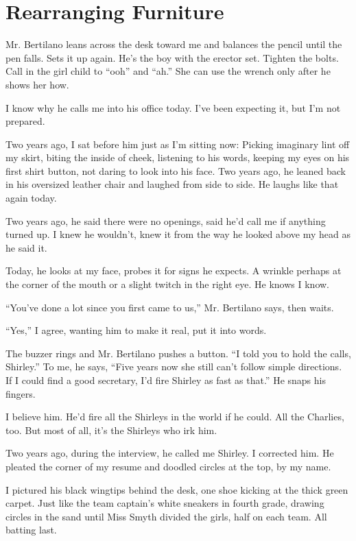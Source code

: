 \documentclass[twoside,10pt]{book}
\begin{document}
\cleardoublepage
\chapter{Rearranging Furniture}

Mr. Bertilano leans across the desk toward me and balances the pencil
until the pen falls. Sets it up again. He's the boy with the erector
set. Tighten the bolts. Call in the girl child to ``ooh'' and ``ah.'' She
can use the wrench only after he shows her how.

I know why he calls me into his office today. I've been expecting it,
but I'm not prepared.

Two years ago, I sat before him just as I'm sitting now: Picking
imaginary lint off my skirt, biting the inside of cheek, listening to
his words, keeping my eyes on his first shirt button, not daring to look
into his face. Two years ago, he leaned back in his oversized leather
chair and laughed from side to side. He laughs like that again today.

Two years ago, he said there were no openings, said he'd call me if
anything turned up. I knew he wouldn't, knew it from the way he looked
above my head as he said it.

Today, he looks at my face, probes it for signs he expects. A wrinkle
perhaps at the corner of the mouth or a slight twitch in the right eye.
He knows I know.

``You've done a lot since you first came to us,'' Mr. Bertilano says,
then waits.

``Yes,'' I agree, wanting him to make it real, put it into words.

The buzzer rings and Mr. Bertilano pushes a button. ``I told you to hold
the calls, Shirley.'' To me, he says, ``Five years now she still can't
follow simple directions. If I could find a good secretary, I'd fire
Shirley as fast as that.'' He snaps his fingers.

I believe him. He'd fire all the Shirleys in the world if he could. All
the Charlies, too. But most of all, it's the Shirleys who irk him.

Two years ago, during the interview, he called me Shirley. I corrected
him. He pleated the corner of my resume and doodled circles at the top,
by my name.

I pictured his black wingtips behind the desk, one shoe kicking at the
thick green carpet. Just like the team captain's white sneakers in
fourth grade, drawing circles in the sand until Miss Smyth divided the
girls, half on each team. All batting last.
\end{document}
